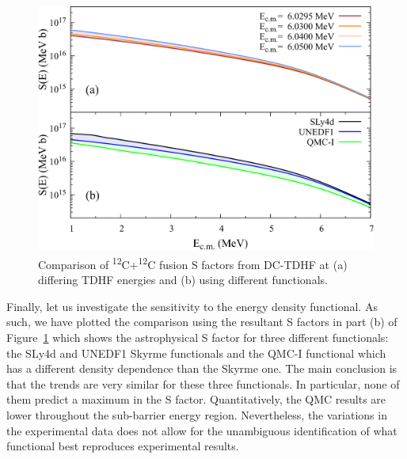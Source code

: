 \begin{figure}
	\includegraphics*[width=\textwidth]{../Figures/CC/SFactorsComp.pdf}
	\caption{Comparison of \textsuperscript{12}C+\textsuperscript{12}C fusion S factors from DC-TDHF at (a) differing TDHF energies and (b) using different functionals.}
	\label{fig:sfaccomp}
\end{figure}

Finally, let us investigate the sensitivity to the energy density functional. 
As such, we have plotted the comparison using the resultant S factors in part (b) of Figure~\ref{fig:sfaccomp} which shows the astrophysical S factor for three different functionals: the SLy4d \protect\citep{kim1997} and UNEDF1 \protect\citep{kortelainen2012} Skyrme functionals and the QMC-I functional which has a different density dependence than the Skyrme one. 
The main conclusion is that the trends are very similar for these three functionals. In particular, none of them predict a maximum in the S factor. 
Quantitatively, the QMC results are lower throughout the sub-barrier energy region.
Nevertheless, the variations in the experimental data does not allow for the unambiguous identification of what functional best reproduces experimental results.




